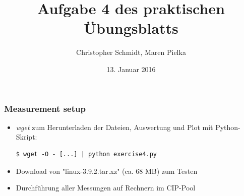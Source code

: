 \documentclass[handout]{beamer}
\title[Aufgabe 4]{Aufgabe 4 des praktischen Übungsblatts}
\author[Schmidt, Pielka]{Christopher Schmidt, Maren Pielka}
\institute[Uni Bonn]{Universität Bonn}
\date[13.01.16]{13. Januar 2016}
\begin{document}
\begin{frame}
\titlepage
\end{frame}

\begin{frame}[containsverbatim]
\frametitle{Measurement setup}
\begin{itemize}
\item \textit{wget} zum Herunterladen der Dateien, Auswertung und Plot mit Python-Skript:
\lstset{language=sh,basicstyle=\footnotesize}
\begin{lstlisting}
$ wget -O - [...] | python exercise4.py
\end{lstlisting}
\item Download von "linux-3.9.2.tar.xz" (ca. 68 MB) zum Testen
\item Durchführung aller Messungen auf Rechnern im CIP-Pool
\end{itemize}
\end{frame}
\end{document}
